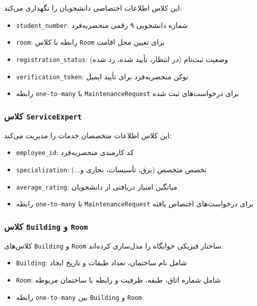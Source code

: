 \documentclass[12pt,a4paper]{report}
\begin{document}
	این کلاس اطلاعات اختصاصی دانشجویان را نگهداری می‌کند:
	
	\begin{itemize}
		\item \texttt{student\_number}: شماره دانشجویی ۹ رقمی منحصربه‌فرد
		\item \texttt{room}: رابطه با کلاس \texttt{Room} برای تعیین محل اقامت
		\item \texttt{registration\_status}: وضعیت ثبت‌نام (در انتظار، تأیید شده، رد شده)
		\item \texttt{verification\_token}: توکن منحصربه‌فرد برای تأیید ایمیل
		\item رابطه \texttt{one-to-many} با \texttt{MaintenanceRequest} برای درخواست‌های ثبت شده
	\end{itemize}
	
	\subsubsection*{کلاس \texttt{ServiceExpert}}
	
	این کلاس اطلاعات متخصصان خدمات را مدیریت می‌کند:
	
	\begin{itemize}
		\item \texttt{employee\_id}: کد کارمندی منحصربه‌فرد
		\item \texttt{specialization}: تخصص متخصص (برق، تأسیسات، نجاری و...)
		\item \texttt{average\_rating}: میانگین امتیاز دریافتی از دانشجویان
		\item رابطه \texttt{one-to-many} با \texttt{MaintenanceRequest} برای درخواست‌های اختصاص یافته
	\end{itemize}
	
	\subsubsection*{کلاس \texttt{Building} و \texttt{Room}}
	
	کلاس‌های \texttt{Building} و \texttt{Room} ساختار فیزیکی خوابگاه را مدل‌سازی کرده‌اند:
	
	\begin{itemize}
		\item \texttt{Building}: شامل نام ساختمان، تعداد طبقات و تاریخ ایجاد
		\item \texttt{Room}: شامل شماره اتاق، طبقه، ظرفیت و رابطه با ساختمان مربوطه
		\item رابطه \texttt{one-to-many} بین \texttt{Building} و \texttt{Room}
	\end{itemize}
	
\end{document}
